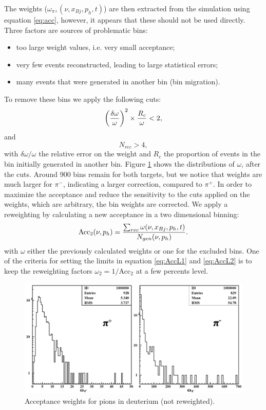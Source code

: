 The weights ($\omega_{\pi^\pm}(\nu,x_{Bj},p_h,t)$) are then extracted from 
the simulation using equation \ref{eq:acc}, however, it appears that these should not be used directly.
Three factors are sources of problematic bins:
\begin{itemize}
 \item too large weight values, i.e. very small acceptance;
 \item very few events reconstructed, leading to large statistical errors;
 \item many events that were generated in another bin (bin migration).
\end{itemize}
To remove these bins we apply the following cuts:
\begin{equation} \label{eq:AccL1}
\left ({\delta \omega \over \omega}\right ) ^2 \times {R_c \over \omega} < 2,
\end{equation}
and
\begin{equation} \label{eq:AccL2}
N_{rec} > 4,
\end{equation}
with $\delta \omega / \omega$ the relative error on the weight and $R_c$ the 
proportion of events in the bin initially generated in another bin. Figure 
\ref{fig:AccCoef} shows the distributions of $\omega$, after the cuts. Around 
900 bins remain for both targets, but we notice that weights are much larger 
for $\pi^-$, indicating a larger correction, compared to $\pi^+$. In order to 
maximize the acceptance and reduce the sensitivity to the cuts applied on the 
weights, which are arbitrary, the bin weights are corrected. We apply a 
reweighting by calculating a new acceptance in a two dimensional binning:
\begin{equation}
\text{Acc}_2(\nu,p_h) = {\sum_{rec} \omega (\nu,x_{Bj},p_h,t)\over N_{gen}(\nu,p_h)}.
\end{equation}
with $\omega$ either the previously calculated weights or one for the 
excluded bins.
One of the criteria for setting the limits in equation \ref{eq:AccL1} and 
\ref{eq:AccL2} is to keep the reweighting factors $\omega_2 = 1/\text{Acc}_2$ at a few 
percents level.

\begin{figure}[tbp]
\centering
\includegraphics[width=14cm] {chap5-fig/pawpipdeut.png}
\caption {Acceptance weights for pions in deuterium (not reweighted).}
\label{fig:AccCoef}
\end{figure}

